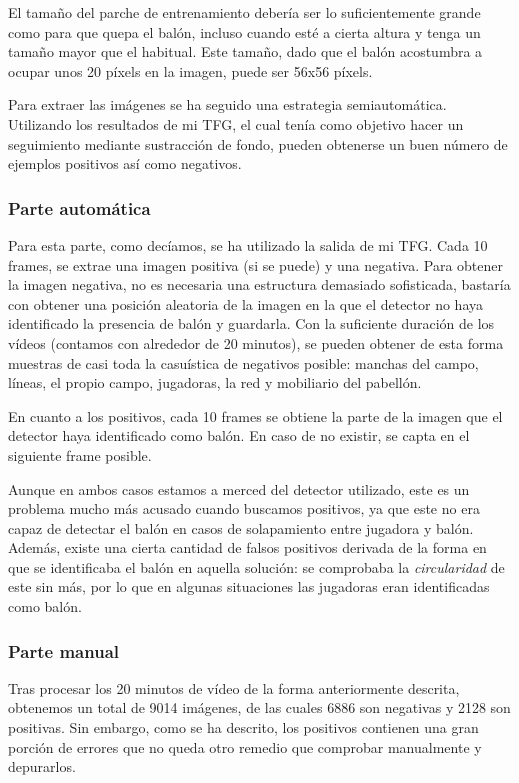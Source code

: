 El tamaño del parche de entrenamiento debería ser lo suficientemente grande como para que quepa el balón, incluso cuando esté a cierta altura y tenga un tamaño mayor que el habitual. Este tamaño, dado que el balón acostumbra a ocupar unos 20 píxels en la imagen, puede ser 56x56 píxels.

Para extraer las imágenes se ha seguido una estrategia semiautomática. Utilizando los resultados de mi TFG, el cual tenía como objetivo hacer un seguimiento mediante sustracción de fondo, pueden obtenerse un buen número de ejemplos positivos así como negativos.

\subsubsection*{Parte automática}

Para esta parte, como decíamos, se ha utilizado la salida de mi TFG. Cada 10 frames, se extrae una imagen positiva (si se puede) y una negativa. Para obtener la imagen negativa, no es necesaria una estructura demasiado sofisticada, bastaría con obtener una posición aleatoria de la imagen en la que el detector no haya identificado la presencia de balón y guardarla. Con la suficiente duración de los vídeos (contamos con alrededor de 20 minutos), se pueden obtener de esta forma muestras de casi toda la casuística de negativos posible: manchas del campo, líneas, el propio campo, jugadoras, la red y mobiliario del pabellón.

En cuanto a los positivos, cada 10 frames se obtiene la parte de la imagen que el detector haya identificado como balón. En caso de no existir, se capta en el siguiente frame posible.

Aunque en ambos casos estamos a merced del detector utilizado, este es un problema mucho más acusado cuando buscamos positivos, ya que este no era capaz de detectar el balón en casos de solapamiento entre jugadora y balón. Además, existe una cierta cantidad de falsos positivos derivada de la forma en que se identificaba el balón en aquella solución: se comprobaba la \textit{circularidad} de este sin más, por lo que en algunas situaciones las jugadoras eran identificadas como balón.

\subsubsection*{Parte manual}

Tras procesar los 20 minutos de vídeo de la forma anteriormente descrita, obtenemos un total de 9014 imágenes, de las cuales 6886 son negativas y 2128 son positivas. Sin embargo, como se ha descrito, los positivos contienen una gran porción de errores que no queda otro remedio que comprobar manualmente y depurarlos.

